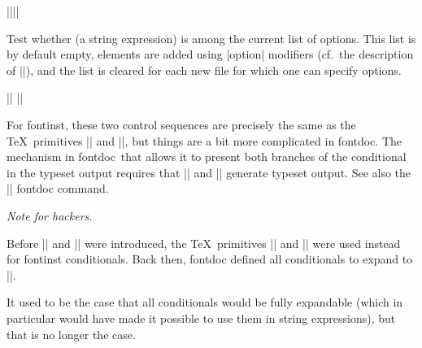 \documentclass[a4paper]{ltxguide}
\newenvironment{hackernote}{%
   \list{}{
     \setlength{\leftmargin}{0pt}%
     \setlength\labelwidth{0pt}%
     \setlength{\listparindent}{1.4em}%
     \setlength{\parsep}{0pt plus 1pt}%
     \setlength{\itemsep}{\medskipamount}%
   }\item[]%
   \small
   \textit{Note for hackers.}\hspace{0.5em}%
}{\endlist}
\newcommand*{\meta}{\m}
\newcommand*{\marg}{\arg}
\newcommand*{\setpackagename}[1]{\textsf{#1}}
\newcommand{\fontinst}{\setpackagename{font\-inst}\xspace}
\newcommand{\fontdoc}{\setpackagename{font\-doc}\xspace}
\begin{document}
\begin{decl}[v1.924]
  |\ifoption|\marg{string}|\then|
\end{decl}
Test whether \meta{string} (a string expression) is among the current 
list of options. This list is by default empty, elements are added 
using |option| modifiers (cf.~the description of |\installfont|), and 
the list is cleared for each new file for which one can specify 
options.

\begin{decl}[v1.909]
  |\Else|
  |\Fi|
\end{decl}
For \fontinst, these two control sequences are precisely the same as 
the \TeX\ primitives |\else| and |\fi|, but things are a bit more 
complicated in \fontdoc. The mechanism in \fontdoc\ that allows it to 
present both branches of the conditional in the typeset output 
requires that |\Else| and |\Fi| generate typeset output. See also the 
|\showbranches| \fontdoc command.

\begin{hackernote}
  Before |\Else| and |\Fi| were introduced, the \TeX\ primitives 
  |\else| and |\fi| were used instead for \fontinst conditionals. 
  Back then, \fontdoc defined all conditionals to expand to |\iftrue|.
  
  It used to be the case that all conditionals would be fully 
  expandable (which in particular would have made it possible to use 
  them in string expressions), but that is no longer the case.
\end{hackernote}
\end{document}
